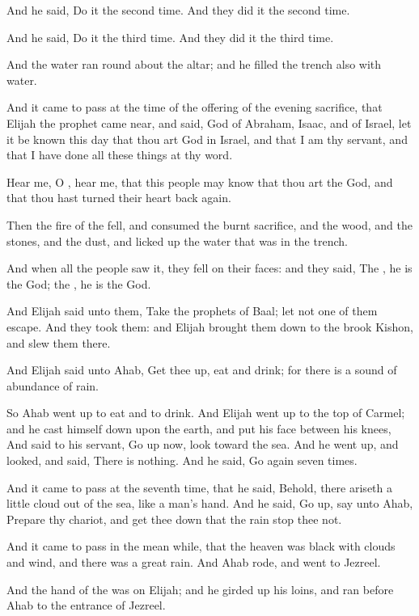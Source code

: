 \Verse And he said, Do it the second time. And they did it the second time.

And he said, Do it the third time. And they did it the third time.

\Verse And the water ran round about the altar; and he filled the trench also with water.

\Verse And it came to pass at the time of the offering of the evening sacrifice, that Elijah the prophet came near, and said, \LORD God of Abraham, Isaac, and of Israel, let it be known this day that thou art God in Israel, and that I am thy servant, and that I have done all these things at thy word.

\Verse Hear me, O \LORD, hear me, that this people may know that thou art the \LORD God, and that thou hast turned their heart back again.

\Verse Then the fire of the \LORD fell, and consumed the burnt sacrifice, and the wood, and the stones, and the dust, and licked up the water that was in the trench.

\Verse And when all the people saw it, they fell on their faces: and they said, The \LORD, he is the God; the \LORD, he is the God.

\Verse And Elijah said unto them, Take the prophets of Baal; let not one of them escape. And they took them: and Elijah brought them down to the brook Kishon, and slew them there.

\Verse And Elijah said unto Ahab, Get thee up, eat and drink; for there is a sound of abundance of rain.

\Verse So Ahab went up to eat and to drink. And Elijah went up to the top of Carmel; and he cast himself down upon the earth, and put his face between his knees, \Verse And said to his servant, Go up now, look toward the sea. And he went up, and looked, and said, There is nothing. And he said, Go again seven times.

\Verse And it came to pass at the seventh time, that he said, Behold, there ariseth a little cloud out of the sea, like a man's hand. And he said, Go up, say unto Ahab, Prepare thy chariot, and get thee down that the rain stop thee not.

\Verse And it came to pass in the mean while, that the heaven was black with clouds and wind, and there was a great rain. And Ahab rode, and went to Jezreel.

\Verse And the hand of the \LORD was on Elijah; and he girded up his loins, and ran before Ahab to the entrance of Jezreel.



